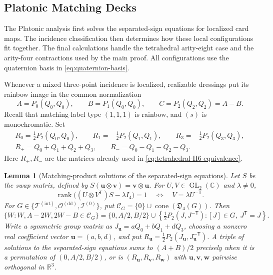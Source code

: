 \documentclass[11pt,letterpaper,onecolumn]{article}
\theoremstyle{plain}
\newtheorem{lemma}[lemma]{Lemma}
\theoremstyle{definition}
\theoremstyle{remark}
\newcommand{\TetInt}{{\mathcal T^{(\mathrm{int})}}}
\newcommand{\OctDD}{{\mathcal O^{(\mathrm{dd})}}}
\newcommand{\IcoZero}{{\mathcal I^{(0)}}}
\newcommand{\GL}{\operatorname{GL}}
\newcommand{\rank}{\operatorname{rank}}
\begin{document}
\subsection{Platonic Matching Decks}
\label{appsec:cert-platonic}
\label{proofsec:platonic-matching-certificates}

The Platonic analysis first solves the separated-sign equations for
localized card maps. The incidence classification then determines how
these local configurations fit together. The final calculations handle
the tetrahedral arity-eight case and the arity-four contractions used by
the main proof. All configurations use the quaternion basis in
\cref{eq:quaternion-basis}.

Whenever a mixed three-point incidence is localized, realizable dressings put
its rainbow image in the common normalization
\begin{equation}
 A=P_0(Q_0,Q_0),\qquad
 B=P_1(Q_0,Q_0),\qquad
 C=P_2(Q_2,Q_2)=A-B.
 \label{eq:cert-A4-normal-incidence}
\end{equation}
Recall that matching-label type \((1,1,1)\) is rainbow, and \((s)\) is monochromatic. Set
\begin{equation}
\begin{gathered}
 R_0=\tfrac12P_2(Q_0,Q_0),\qquad
 R_1=-\tfrac12P_2(Q_1,Q_1),\qquad
 R_3=-\tfrac12P_2(Q_3,Q_3),\\
 R_+=Q_0+Q_1+Q_2+Q_3,\qquad
 R_-=Q_0-Q_1-Q_2-Q_3.
\end{gathered}
\label{eq:cert-platonic-common-vectors}
\end{equation}
Here \(R_+,R_-\) are the matrices already used in
\cref{eq:tetrahedral-H6-equivalence}.

\begin{lemma}[Matching-product solutions of the separated-sign equations]
\label{lem:platonic-bridge-formula}
Let \(S\) be the swap matrix, defined by \(S({\mathbf{u}}\otimes {\mathbf{v}})={\mathbf{v}}\otimes {\mathbf{u}}\).
For \(U,V\in\GL_2(\mathbb C)\) and \(\lambda\ne0\),
\begin{equation}
 \rank\bigl((U\otimes V^{\mathsf T})S-\lambda I_4\bigr)=1
 \quad\Longleftrightarrow\quad V=\lambda U^{-\mathsf T}.
 \label{eq:platonic-swap-rank-one}
\end{equation}
For \(G\in\{\TetInt,\OctDD,\IcoZero\}\), put
\(\mathscr C_G=\{0\}\cup\operatorname{cone}(\mathfrak D_4(G))\).
Then
\begin{equation}
 \{W:W,A-2W,2W-B\in\mathscr C_G\}
 =\{0,A/2,B/2\}\cup
 \left\{\tfrac12P_2(J,J^{-\mathsf T}):[J]\in G,
                                      \ J^{\mathsf T}=J\right\}.
 \label{eq:platonic-symmetric-bridge}
\end{equation}
Write a symmetric group matrix as \(J_{\mathbf{u}}=aQ_0+bQ_1+dQ_3\), choosing a
nonzero real coefficient vector \({\mathbf{u}}=(a,b,d)\), and put
\(R_{\mathbf{u}}=\tfrac12P_2(J_{\mathbf{u}},J_{\mathbf{u}}^{-\mathsf T})\).
A triple of solutions to the separated-sign equations sums to \((A+B)/2\) precisely when it is a
permutation of \((0,A/2,B/2)\), or is \((R_{\mathbf{u}},R_{\mathbf{v}},R_{\mathbf{w}})\) with
\({\mathbf{u}},{\mathbf{v}},{\mathbf{w}}\) pairwise orthogonal in \(\mathbb R^3\).
\end{lemma}
\end{document}
